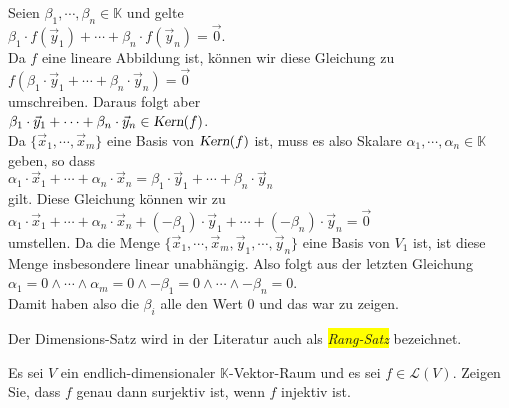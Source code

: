 \begin{enumerate}
      Seien $\beta_1, \cdots, \beta_n \in \mathbb{K}$ und gelte
      \\[0.2cm]
      \hspace*{1.3cm}
      $\beta_1 \cdot f(\vec{y}_1) + \cdots + \beta_n \cdot f(\vec{y}_n) = \vec{0}$.
      \\[0.2cm]
      Da $f$ eine lineare Abbildung ist, k\"{o}nnen wir diese Gleichung zu
      \\[0.2cm]
      \hspace*{1.3cm}
      $f(\beta_1 \cdot \vec{y}_1 + \cdots + \beta_n \cdot \vec{y}_n) = \vec{0}$
      \\[0.2cm]
      umschreiben.  Daraus folgt aber
      \\[0.2cm]
      \hspace*{1.3cm}
      $\beta_1 \cdot \vec{y}_1 + \cdots + \beta_n \cdot \vec{y}_n \in \textsl{Kern}(f)$.
      \\[0.2cm]
      Da $\{ \vec{x}_1, \cdots, \vec{x}_m \}$ eine Basis von $\textsl{Kern}(f)$ ist, muss es also
      Skalare $\alpha_1, \cdots, \alpha_n \in \mathbb{K}$ geben, so dass
      \\[0.2cm]
      \hspace*{1.3cm}
      $\alpha_1 \cdot \vec{x}_1 + \cdots + \alpha_n \cdot \vec{x}_n = \beta_1 \cdot \vec{y}_1 + \cdots + \beta_n \cdot \vec{y}_n$
      \\[0.2cm]
      gilt.  Diese Gleichung k\"{o}nnen wir zu
      \\[0.2cm]
      \hspace*{1.3cm}
      $\alpha_1 \cdot \vec{x}_1 + \cdots + \alpha_n \cdot \vec{x}_n + (-\beta_1) \cdot \vec{y}_1 + \cdots + (-\beta_n) \cdot \vec{y}_n = \vec{0}$
      \\[0.2cm]
      umstellen.  Da die Menge $\{ \vec{x}_1, \cdots, \vec{x}_m,  \vec{y}_1, \cdots, \vec{y}_n \}$
      eine Basis von $V_1$ ist, ist diese Menge insbesondere linear unabh\"{a}ngig.  Also
      folgt aus der letzten Gleichung
      \\[0.2cm]
      \hspace*{1.3cm}
      $\alpha_1 = 0 \wedge \cdots \wedge \alpha_m = 0 \wedge -\beta_1 = 0 \wedge \cdots \wedge -\beta_n = 0$.
      \\[0.2cm]
      Damit haben also die $\beta_i$ alle den Wert $0$ und das war zu zeigen. \qeds
\end{enumerate}
\remark
Der Dimensions-Satz wird in der Literatur auch als \colorbox{yellow}{\emph{Rang-Satz}} bezeichnet.
\eoxs

\exercise
Es sei $V$ ein endlich-dimensionaler $\mathbb{K}$-Vektor-Raum und es sei $f \in \mathcal{L}(V)$.
Zeigen Sie, dass $f$ genau dann surjektiv ist, wenn $f$ injektiv ist. \exend


